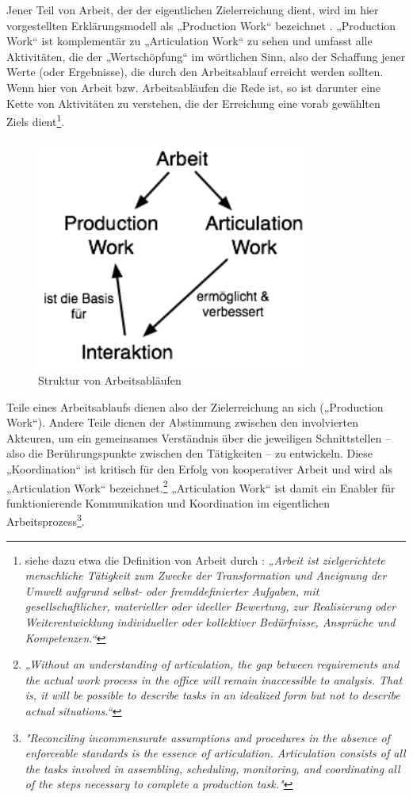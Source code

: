Jener Teil von Arbeit, der der eigentlichen Zielerreichung dient, wird im hier vorgestellten Erklärungsmodell als „Production Work“ bezeichnet \citep{Fujimura87}. „Production Work“ ist komplementär zu „Articulation Work“ zu sehen und umfasst alle Aktivitäten, die der „Wertschöpfung“ im wörtlichen Sinn, also der Schaffung jener Werte (oder Ergebnisse), die durch den Arbeitsablauf erreicht werden sollten. Wenn hier von Arbeit bzw. Arbeitsabläufen die Rede ist, so ist darunter eine Kette von Aktivitäten zu verstehen, die der Erreichung eine vorab gewählten Ziels dient\footnote{siehe dazu etwa die Definition von Arbeit durch \citet{Semmer04}: \emph{„Arbeit ist zielgerichtete menschliche Tätigkeit zum Zwecke der Transformation und Aneignung der Umwelt aufgrund selbst- oder fremddefinierter Aufgaben, mit gesellschaftlicher, materieller oder ideeller Bewertung, zur Realisierung oder Weiterentwicklung individueller oder kollektiver Bedürfnisse, Ansprüche und Kompetenzen.“}}. 

\begin{figure}[htbp]
	\centering
		\includegraphics[height=3in]{img/ArticulationWork/ArbeitInteraktion.png}
	\caption{Struktur von Arbeitsabläufen}
	\label{fig:img_ArticulationWork_ArbeitInteraktion}
\end{figure}

Teile eines Arbeitsablaufs dienen also der Zielerreichung an sich („Production Work“). Andere Teile dienen der Abstimmung zwischen den involvierten Akteuren, um ein gemeinsames Verständnis über die jeweiligen Schnittstellen – also die Berührungspunkte zwischen den Tätigkeiten – zu entwickeln. Diese „Koordination“ ist kritisch für den Erfolg von kooperativer Arbeit \citep{Strauss93} und wird als „Articulation Work“ bezeichnet.\footnote{\emph{„Without an understanding of articulation, the gap between requirements and the actual work process in the office will remain inaccessible to analysis. That is, it will be possible to describe tasks in an idealized form but not to describe actual situations.“}\citep{Gerson86}} „Articulation Work“ ist damit ein Enabler für funktionierende Kommunikation und Koordination im eigentlichen Arbeitsprozess\footnote{\emph{"Reconciling incommensurate assumptions and procedures in the absence of enforceable standards is the essence of articulation. Articulation consists of all the tasks involved in assembling, scheduling, monitoring, and coordinating all of the steps necessary to complete a production task."}\citep{Gerson86}}. 

